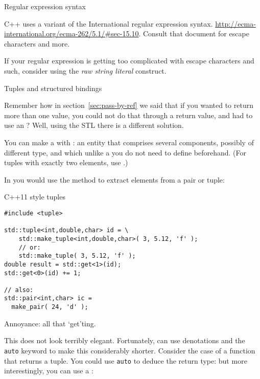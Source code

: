 
 {Regular expression syntax}

C++ uses a variant of the  International regular expression syntax.
\url{http://ecma-international.org/ecma-262/5.1/#sec-15.10}.
Consult that document for escape characters and more.

If your regular expression is getting too complicated with escape characters
and such, consider using the
\emph{raw string literal}
construct.

 {Tuples and structured bindings}
\label{sec:tuple}

Remember how in section~\ref{sec:pass-by-ref} we said that if you
wanted to return more than one value, you could not do that through a
return value, and had to use an ?
Well, using the \ac{STL} there is a different solution.

You can make a  with :
an entity that comprises several
components, possibly of different type, and which unlike a
 you do not need to define beforehand.
(For tuples with exactly two elements, use .)

In  you would use the  method
to extract elements from a pair or tuple:

\lstset{style=reviewcode,language=C++}
\begin{block}{C++11 style tuples}
  \label{sl:tuple11}
\begin{lstlisting}
#include <tuple>

std::tuple<int,double,char> id = \
    std::make_tuple<int,double,char>( 3, 5.12, 'f' );
    // or:
    std::make_tuple( 3, 5.12, 'f' );
double result = std::get<1>(id);
std::get<0>(id) += 1;

// also:
std::pair<int,char> ic = 
  make_pair( 24, 'd' );
\end{lstlisting}
Annoyance: all that `get'ting.
\end{block}

This does not look terribly elegant. Fortunately,
 can use denotations and the \lstinline{auto}
keyword to make this considerably shorter. Consider the case of a
function that returns a tuple. You could use \lstinline{auto} to deduce the
return type:
%
%
but more interestingly, you can use a
:
%

